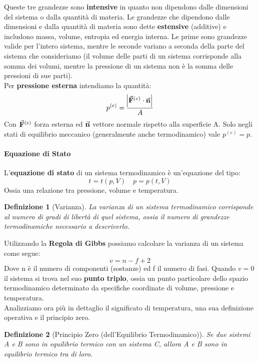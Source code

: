 \documentclass{article}
\newtheorem{defn}{Definizione}[section]
\newcommand{\note}{\noindent {\quad \bf \underline{Osservazione:}} \quad}
\newcommand{\F}{\va{F}}
\begin{document}
Queste tre grandezze sono \textbf{intensive} in quanto non dipendono dalle dimensioni del sistema o dalla quantità di materia. Le grandezze che dipendono dalle dimensioni e dalla quantità di materia sono dette \textbf{estensive} (additive) e includono massa, volume, entropia ed energia interna. Le prime sono grandezze valide per l'intero sistema, mentre le seconde variano a seconda della parte del sistema che consideriamo (il volume delle parti di un sistema corrisponde alla somma dei volumi, mentre la pressione di un sistema non è la somma delle pressioni di sue parti).\\
\note Per \textbf{pressione esterna} intendiamo la quantità:
\[p^{(e)}=\frac{\abs{\F^{(e)}\cdot\va{n}}}{A}\]
Con $\F^{(e)}$ forza esterna ed $\va{n}$ vettore normale rispetto alla superficie A. Solo negli stati di equilibrio meccanico (generalmente anche termodinamico) vale $p^{(e)}=p$.

\paragraph{Equazione di Stato}
L'\textbf{equazione di stato} di un sistema termodinamico è un'equazione del tipo:
\[t=t(p,V)\quad p=p(t,V)\]
Ossia una relazione tra pressione, volume e temperatura.
\begin{defn}[Varianza]
La varianza di un sistema termodinamico corrisponde al numero di gradi di libertà di quel sistema, ossia il numero di grandezze termodinamiche necessario a descriverlo. 
\end{defn}
Utilizzando la \textbf{Regola di Gibbs} possiamo calcolare la varianza di un sistema come segue:
\begin{equation}
    \boxed{v=n-f+2}
\end{equation}
Dove n è il numero di componenti (sostanze) ed f il numero di fasi. Quando $v=0$ il sistema si trova nel suo \textbf{punto triplo}, ossia un punto particolare dello spazio termodinamico determinato da specifiche coordinate di volume, pressione e temperatura. \\

Analizziamo ora più in dettaglio il significato di temperatura, una sua definizione operativa e il principio zero.
\begin{defn}[Principio Zero (dell'Equilibrio Termodinamico)]
Se due sistemi A e B sono in equilibrio termico con un sistema C, allora A e B sono in equilibrio termico tra di loro.
\end{defn}
\end{document}
